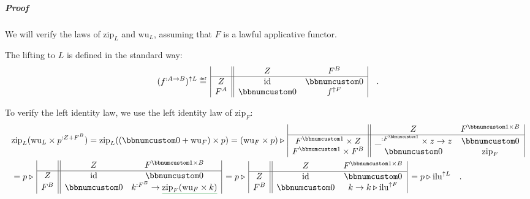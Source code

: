 \subparagraph{Proof}

We will verify the laws of $\text{zip}_{L}$ and $\text{wu}_{L}$,
assuming that $F$ is a lawful applicative functor.

The lifting to $L$ is defined in the standard way:
\[
(f^{:A\rightarrow B})^{\uparrow L}\triangleq\,\begin{array}{|c||cc|}
 & Z & F^{B}\\
\hline Z & \text{id} & \bbnum 0\\
F^{A} & \bbnum 0 & f^{\uparrow F}
\end{array}\quad.
\]

To verify the left identity law, we use the left identity law of $\text{zip}_{F}$:
\begin{align*}
 & \text{zip}_{L}(\text{wu}_{L}\times p^{:Z+F^{B}})=\text{zip}_{L}((\bbnum 0+\text{wu}_{F})\times p)=(\text{wu}_{F}\times p)\triangleright\,\begin{array}{|c||cc|}
 & Z & F^{\bbnum 1\times B}\\
\hline F^{\bbnum 1}\times Z & \_^{:F^{\bbnum 1}}\times z\rightarrow z & \bbnum 0\\
F^{\bbnum 1}\times F^{B} & \bbnum 0 & \text{zip}_{F}
\end{array}\\
 & =p\triangleright\,\begin{array}{|c||cc|}
 & Z & F^{\bbnum 1\times B}\\
\hline Z & \text{id} & \bbnum 0\\
F^{B} & \bbnum 0 & k^{:F^{B}}\rightarrow\gunderline{\text{zip}_{F}(\text{wu}_{F}\times k)}
\end{array}\,=p\triangleright\,\begin{array}{|c||cc|}
 & Z & F^{\bbnum 1\times B}\\
\hline Z & \text{id} & \bbnum 0\\
F^{B} & \bbnum 0 & k\rightarrow k\triangleright\text{ilu}^{\uparrow F}
\end{array}\,=p\triangleright\text{ilu}^{\uparrow L}\quad.
\end{align*}

